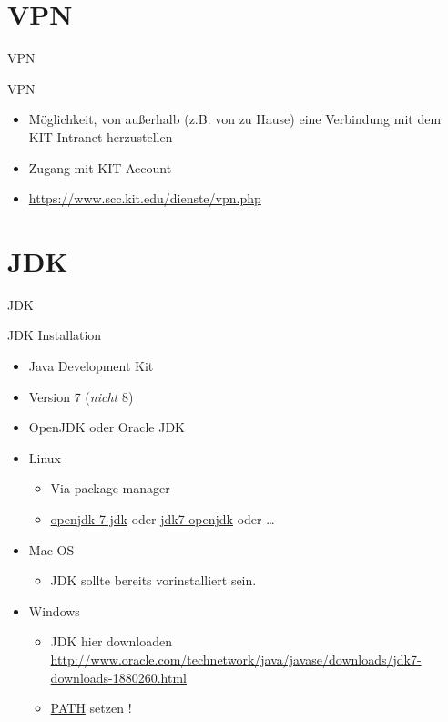 \documentclass[18pt]{beamer}
\begin{document}
\section{VPN}

\begin{frame}{VPN}
    \begin{block}{VPN}
        \begin{itemize}
            \item Möglichkeit, von außerhalb (z.B. von zu Hause) eine Verbindung mit dem KIT-Intranet herzustellen
            \item Zugang mit KIT-Account
            \item \url{https://www.scc.kit.edu/dienste/vpn.php}
        \end{itemize}
    \end{block}
\end{frame}

\section{JDK}

\begin{frame}{JDK}
    \begin{block}{JDK Installation}
        \begin{itemize}
            \item Java Development Kit
            \item Version 7 (\textit{nicht} 8)
            \item OpenJDK oder Oracle JDK
            \pause
            \item Linux
            \begin{itemize}
                \item Via package manager
                \item \url{openjdk-7-jdk} oder \url{jdk7-openjdk} oder \dots
            \end{itemize}
            \item Mac OS
            \begin{itemize}
                \item JDK sollte bereits vorinstalliert sein.
            \end{itemize}
            \item Windows
            \begin{itemize}
                \item JDK hier downloaden\\
                \url{http://www.oracle.com/technetwork/java/javase/downloads/jdk7-downloads-1880260.html}
                \item \url{PATH} setzen !
            \end{itemize}
        \end{itemize}
    \end{block}
\end{frame}
\end{document}
